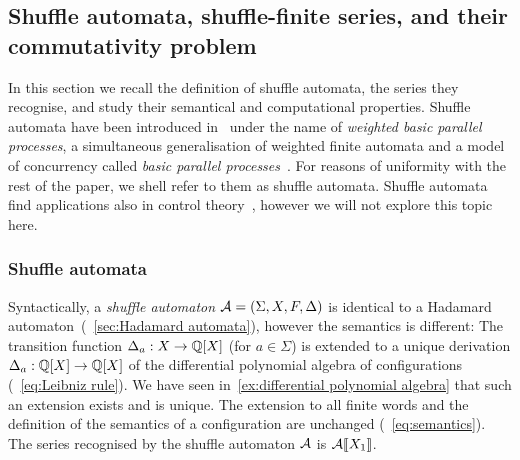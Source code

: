 \subsection{Shuffle automata, shuffle-finite series, and their commutativity problem}
\label{sec:shuffle automata}

In this section we recall the definition of shuffle automata, the series they recognise,
and study their semantical and computational properties.
%
Shuffle automata have been introduced in~\cite{Clemente:CONCUR:2024}
under the name of \emph{weighted basic parallel processes},
a simultaneous generalisation of weighted finite automata
and a model of concurrency called \emph{basic parallel processes}~\cite{Esparza:FI:1997}.
%
For reasons of uniformity with the rest of the paper,
we shell refer to them as shuffle automata.
%
Shuffle automata find applications also in control theory~\cite{Clemente:control:arXiv:2025},
however we will not explore this topic here.

\subsubsection{Shuffle automata}
\label{sec:shuffle automata:definition}

Syntactically, a \emph{shuffle automaton} $\AA = \tuple{\Sigma, X, F, \Delta}$
is identical to a Hadamard automaton~(\cf~\cref{sec:Hadamard automata}),
however the semantics is different:
%
The transition function $\Delta_a : X \to \poly \Q X$ (for $a \in \Sigma$)
is extended to a unique derivation $\Delta_a : \poly \Q X \to \poly \Q X$
of the differential polynomial algebra of configurations (\cf~\cref{eq:Leibniz rule}).
%
We have seen in~\cref{ex:differential polynomial algebra} that such an extension exists and is unique.
The extension to all finite words and the definition of the semantics of a configuration are unchanged
(\cf~\cref{eq:semantics}).
%
The series recognised by the shuffle automaton $\AA$ is $\Asem \AA {X_1}$.

